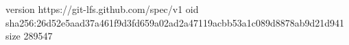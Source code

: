 version https://git-lfs.github.com/spec/v1
oid sha256:26d52e5aad37a461f9d3fd659a02ad2a47119acbb53a1c089d8878ab9d21d941
size 289547
